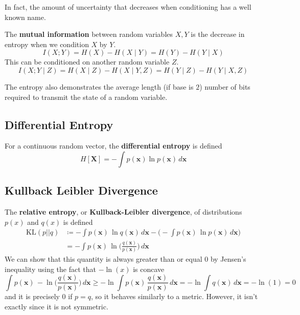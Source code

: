 \documentclass{article}
\begin{document}
    In fact, the amount of uncertainty that decreases when conditioning has a well known name. 

    \begin{definition}
      The \textbf{mutual information} between random variables $X, Y$ is the decrease in entropy when we condition $X$ by $Y$. 
      \begin{equation}
        I(X ; Y) = H(X) - H(X \mid Y) = H(Y) - H(Y \mid X)
      \end{equation}
      This can be conditioned on another random variable $Z$. 
      \begin{equation}
        I(X ; Y \mid Z) = H(X \mid Z) - H(X \mid Y, Z) = H(Y \mid Z) - H(Y \mid X, Z)
      \end{equation}
    \end{definition}

    The entropy also demonstrates the average length (if base is $2$) number of bits required to transmit the state of a random variable. 

  \subsection{Differential Entropy}

    \begin{definition}
      For a continuous random vector, the \textbf{differential entropy} is defined 
      \begin{equation}
        H[\mathbf{X}] = - \int p(\mathbf{x}) \ln{p(\mathbf{x})} \,d\mathbf{x}
      \end{equation}
    \end{definition}

  \subsection{Kullback Leibler Divergence}

    The \textbf{relative entropy}, or \textbf{Kullback-Leibler divergence}, of distributions $p(x)$ and $q(x)$ is defined 
    \begin{align*}
      \mathrm{KL}(p || q) & \coloneqq - \int p(\mathbf{x}) \, \ln{q(\mathbf{x})} \,d\mathbf{x} - \bigg( - \int p(\mathbf{x}) \, \ln{p(\mathbf{x})} \,d\mathbf{x} \bigg) \\
      & = - \int p(\mathbf{x}) \, \ln \bigg( \frac{q(\mathbf{x})}{p(\mathbf{x})} \bigg) \,d\mathbf{x} 
    \end{align*}
    We can show that this quantity is always greater than or equal $0$ by Jensen's inequality using the fact that $-\ln(x)$ is concave
    \begin{equation}
      \int p(\mathbf{x}) \, -\ln \bigg( \frac{q(\mathbf{x})}{p(\mathbf{x})} \bigg) \,d\mathbf{x} \geq -\ln \int p(\mathbf{x}) \, \frac{q(\mathbf{x})}{p(\mathbf{x})} \,d\mathbf{x} = -\ln \int q(\mathbf{x}) \,d\mathbf{x} = -\ln(1) = 0
    \end{equation}
    and it is precisely $0$ if $p = q$, so it behaves similarly to a metric. However, it isn't exactly since it is not symmetric. 
\end{document}
